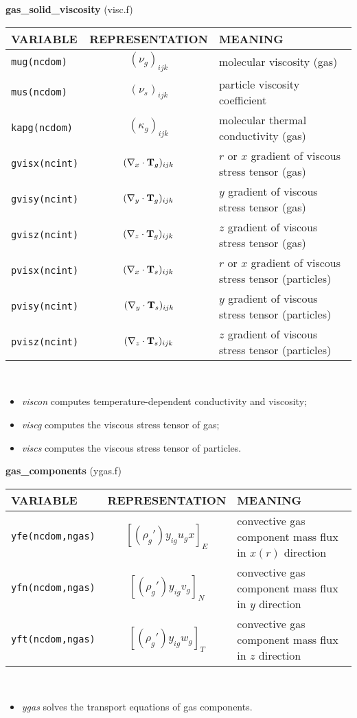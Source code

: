 %
%
{\large{\bf gas\_solid\_viscosity}} (visc.f)\\[5mm]
\begin{tabular}{|p{6cm}|c|p{6cm}|}\hline
VARIABLE & REPRESENTATION & MEANING\\\hline
\tt mug(ncdom)& $(\nu_g)_{ijk}$ &   molecular viscosity (gas)\\\hline
\tt mus(ncdom)& $(\nu_s)_{ijk}$ &   particle viscosity coefficient \\\hline
\tt kapg(ncdom)& $(\kappa_g)_{ijk}$ &   molecular thermal conductivity (gas)\\\hline
\tt gvisx(ncint)& $(\nabla_x\cdot{\bf T}_g)_{ijk}$ & $r$ or $x$ gradient of viscous stress tensor (gas)\\\hline
\tt gvisy(ncint)& $(\nabla_y\cdot{\bf T}_g)_{ijk}$&  $y$ gradient of viscous stress tensor (gas)\\\hline
\tt gvisz(ncint)& $(\nabla_z\cdot{\bf T}_g)_{ijk}$&  $z$ gradient of viscous stress tensor (gas)\\\hline
\tt pvisx(ncint)& $(\nabla_x\cdot{\bf T}_s)_{ijk}$&  $r$ or $x$ gradient of viscous stress tensor (particles)\\\hline
\tt pvisy(ncint)& $(\nabla_y\cdot{\bf T}_s)_{ijk}$&  $y$ gradient of viscous stress tensor (particles)\\\hline
\tt pvisz(ncint)& $(\nabla_z\cdot{\bf T}_s)_{ijk}$&  $z$ gradient of viscous stress tensor (particles)\\\hline
\end{tabular}\\
\begin{itemize}
\item{\em viscon}  computes temperature-dependent conductivity and viscosity;
\item{\em viscg} computes the viscous stress tensor of gas;
\item{\em viscs} computes the viscous stress tensor of particles.
\end{itemize}
%
%
{\large{\bf gas\_components}} (ygas.f)\\[5mm]
\begin{tabular}{|p{6cm}|c|p{6cm}|}\hline
VARIABLE & REPRESENTATION & MEANING\\\hline
\tt yfe(ncdom,ngas) & $\left[ (\rho_g')y_{ig}u_gx \right]_{E} $ & convective gas component mass flux in $x(r)$ direction\\\hline
\tt yfn(ncdom,ngas) & $\left[ (\rho_g')y_{ig}v_g \right]_{N} $ & convective gas component mass flux in $y$ direction\\\hline
\tt yft(ncdom,ngas) & $\left[ (\rho_g')y_{ig}w_g \right]_{T} $ & convective gas component mass flux in $z$ direction\\\hline
\end{tabular}\\
\begin{itemize}
\item{\em ygas} solves the transport equations of gas components.
\end{itemize}
\clearpage
